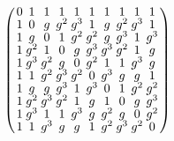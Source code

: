 \documentclass{beamer}
\begin{document}
\begin{frame}

  \begin{tiny}
    \[
      \arraycolsep=1.25pt\def\arraystretch{0.625}
      \left(
        \begin{array}{cccccccccc}
          0&1&1&1&1&1&1&1&1&1\\
          1&0&g&g^{2}&g^{3}&1&g&g^{2}&g^{3}&1\\
          1&g&0&1&g^{2}&g^{2}&g&g^{3}&1&g^{3}\\
          1&g^{2}&1&0&g&g^{3}&g^{3}&g^{2}&1&g\\
          1&g^{3}&g^{2}&g&0&g^{2}&1&1&g^{3}&g\\
          1&1&g^{2}&g^{3}&g^{2}&0&g^{3}&g&g&1\\
          1&g&g&g^{3}&1&g^{3}&0&1&g^{2}&g^{2}\\
          1&g^{2}&g^{3}&g^{2}&1&g&1&0&g&g^{3}\\
          1&g^{3}&1&1&g^{3}&g&g^{2}&g&0&g^{2}\\
          1&1&g^{3}&g&g&1&g^{2}&g^{3}&g^{2}&0\\
        \end{array}
      \right)
    \]


\end{tiny}
\end{frame}
\end{document}
